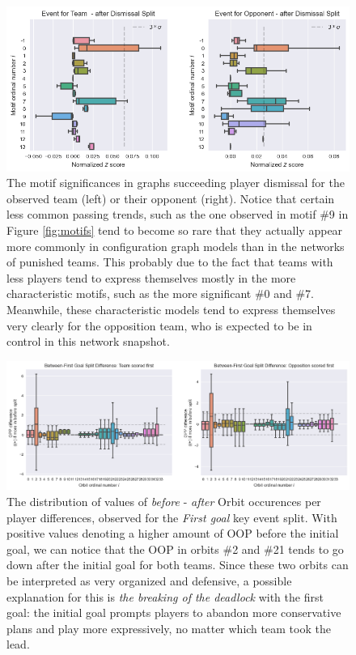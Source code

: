 \documentclass[9pt,twocolumn,twoside]{pnas-report}
\begin{document}
\begin{figure}[t]\centering
	\includegraphics[width=\linewidth]{MotifSignificanceDismissal.png}
	\caption{The motif significances in graphs succeeding player dismissal for the observed team (left) or their opponent (right). Notice that certain less common passing trends, such as the one observed in motif \#9 in Figure \ref{fig:motifs} tend to become so rare that they actually appear more commonly in configuration graph models than in the networks of punished teams. This probably due to the fact that teams with less players tend to express themselves mostly in the more characteristic motifs, such as the more significant \#0 and \#7. Meanwhile, these characteristic models tend to express themselves very clearly for the opposition team, who is expected to be in control in this network snapshot.}
	\label{fig:MotifSignificanceDismissal}
\end{figure}


\begin{figure}[t]\centering
	\includegraphics[width=\linewidth]{OrbitGoals.png}
	\caption{The distribution of values of \textit{before} - \textit{after} Orbit occurences per player differences, observed for the \textit{First goal} key event split. With positive values denoting a higher amount of OOP before the initial goal, we can notice that the OOP in orbits \#2 and \#21 tends to go down after the initial goal for both teams. Since these two orbits can be interpreted as very organized and defensive, a possible explanation for this is \textit{the breaking of the deadlock} with the first goal: the initial goal prompts players to abandon more conservative plans and play more expressively, no matter which team took the lead.}
	\label{fig:OrbitsGoals}
\end{figure}
\end{document}
